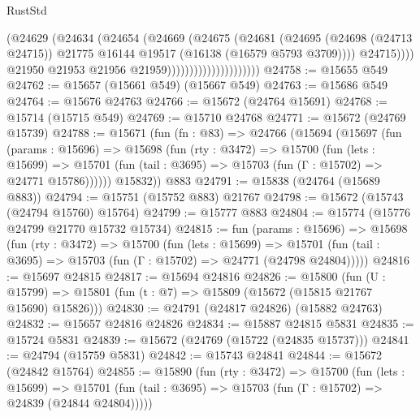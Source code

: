 \begin{lexlean}{RustStd}
\begin{coremodule}
                                            (@24629
                                              (@24634
                                                (@24654
                                                  (@24669
                                                    (@24675
                                                      (@24681
                                                        (@24695
                                                          (@24698 (@24713 @24715))
                                                          @21775
                                                          @16144
                                                          @19517
                                                          (@16138 (@16579 @5793 @3709))))
                                                      @24715))))
                                              @21950
                                              @21953
                                              @21956
                                              @21959)))))))))))))))))))))
@24758 := @15655 @549
@24762 := @15657 (@15661 @549) (@15667 @549)
@24763 := @15686 @549
@24764 := @15676 @24763
@24766 := @15672 (@24764 @15691)
@24768 := @15714 (@15715 @549)
@24769 := @15710 @24768
@24771 := @15672 (@24769 @15739)
@24788 := @15671
    (fun (fn : @83) =>
    @24766
      (@15694
        (@15697
          (fun (params : @15696) =>
          @15698
            (fun (rty : @3472) =>
            @15700
              (fun (lets : @15699) =>
              @15701 (fun (tail : @3695) => @15703 (fun (Γ : @15702) => @24771 @15786))))))
        @15832))
    @883
@24791 := @15838 (@24764 (@15689 @883))
@24794 := @15751 (@15752 @883) @21767
@24798 := @15672 (@15743 (@24794 @15760) @15764)
@24799 := @15777 @883
@24804 := @15774 (@15776 @24799 @21770 @15732 @15734)
@24815 := fun (params : @15696) =>
  @15698
    (fun (rty : @3472) =>
    @15700
      (fun (lets : @15699) =>
      @15701 (fun (tail : @3695) => @15703 (fun (Γ : @15702) => @24771 (@24798 @24804)))))
@24816 := @15697 @24815
@24817 := @15694 @24816
@24826 := @15800
    (fun (U : @15799) => @15801 (fun (t : @7) => @15809 (@15672 (@15815 @21767 @15690) @15826)))
@24830 := @24791 (@24817 @24826) (@15882 @24763)
@24832 := @15657 @24816 @24826
@24834 := @15887 @24815 @5831
@24835 := @15724 @5831
@24839 := @15672 (@24769 (@15722 (@24835 @15737)))
@24841 := @24794 (@15759 @5831)
@24842 := @15743 @24841
@24844 := @15672 (@24842 @15764)
@24855 := @15890
    (fun (rty : @3472) =>
    @15700
      (fun (lets : @15699) =>
      @15701 (fun (tail : @3695) => @15703 (fun (Γ : @15702) => @24839 (@24844 @24804)))))

\end{coremodule}
\end{lexlean}

